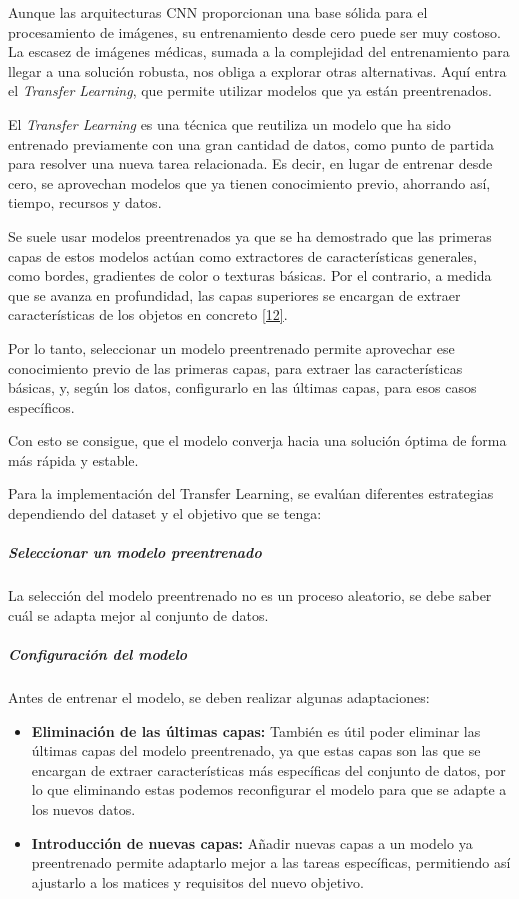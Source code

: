 \documentclass[11pt, a4paper]{article}
\numberwithin{equation}{section}
\begin{document}
Aunque las arquitecturas CNN proporcionan una base sólida para el procesamiento de imágenes, su entrenamiento desde cero puede ser muy costoso. La escasez de imágenes médicas, sumada a la complejidad del entrenamiento para llegar a una solución robusta, nos obliga a explorar otras alternativas. Aquí entra el \textit{Transfer Learning}, que permite utilizar modelos que ya están preentrenados.

El \textit{Transfer Learning} es una técnica que reutiliza un modelo que ha sido entrenado previamente con una gran cantidad de datos, como punto de partida para resolver una nueva tarea relacionada. Es decir, en lugar de entrenar desde cero, se aprovechan modelos que ya tienen conocimiento previo, ahorrando así, tiempo, recursos y datos.

Se suele usar modelos preentrenados ya que se ha demostrado que las primeras capas de estos modelos actúan como extractores de características generales, como bordes, gradientes de color o texturas básicas. Por el contrario, a medida que se avanza en profundidad, las capas superiores se encargan de extraer características de los objetos en concreto \hyperlink{ref:12}{[12]}.

Por lo tanto, seleccionar un modelo preentrenado permite aprovechar ese conocimiento previo de las primeras capas, para extraer las características básicas, y, según los datos, configurarlo en las últimas capas, para esos casos específicos.

Con esto se consigue, que el modelo converja hacia una solución óptima de forma más rápida y estable.

Para la implementación del Transfer Learning, se evalúan diferentes estrategias dependiendo del dataset y el objetivo que se tenga:

\subparagraph{Seleccionar un modelo preentrenado}

La selección del modelo preentrenado no es un proceso aleatorio, se debe saber cuál se adapta mejor al conjunto de datos.

\subparagraph{Configuración del modelo}

Antes de entrenar el modelo, se deben realizar algunas adaptaciones:

\begin{itemize}
\item \textbf{Eliminación de las últimas capas:} También es útil poder eliminar las últimas capas del modelo preentrenado, ya que estas capas son las que se encargan de extraer características más específicas del conjunto de datos, por lo que eliminando estas podemos reconfigurar el modelo para que se adapte a los nuevos datos.

\item \textbf{Introducción de nuevas capas:} Añadir nuevas capas a un modelo ya preentrenado permite adaptarlo mejor a las tareas específicas, permitiendo así ajustarlo a los matices y requisitos del nuevo objetivo.
\end{itemize}
\end{document}
